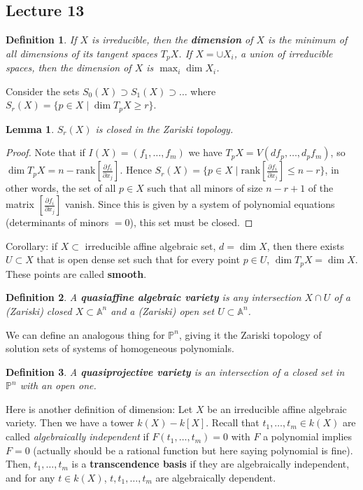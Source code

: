 \documentclass[12pt]{article}
\renewcommand{\P}{\mathbb{P}}
\newcommand{\A}{\mathbb{A}}
\newtheorem{definition}{Definition}[section]
\newtheorem{lemma}{Lemma}[section]
\begin{document}
    \subsection{Lecture 13}
    \begin{definition}
        If $X$ is irreducible, then the \textbf{dimension} of $X$ is the minimum of all dimensions of its tangent spaces $T_pX$. If $X = \cup X_i$, a union of irreducible spaces, then the dimension of $X$ is $\max_i \dim X_i$. 
    \end{definition}
    Consider the sets $S_0(X) \supset S_1(X) \supset \dots$ where $S_r(X) = \{p \in X \mid \dim T_pX \geq r\}$. 
    \begin{lemma}
        $S_r(X)$ is closed in the Zariski topology. 
    \end{lemma}
    \begin{proof}
        Note that if $I(X) = (f_1, \dots, f_m)$ we have $T_pX = V(df_p, \dots, d_pf_m)$, so $\dim T_pX = n - \mathrm{rank}\left[\frac{\partial f_i}{\partial x_j}\right]$. Hence $S_r(X) = \{p \in X \mid \mathrm{rank}\left[\frac{\partial f_i}{\partial x_j}\right] \leq n - r\}$, in other words, the set of all $p \in X$ such that all minors of size $n-r+1$ of the matrix $\left[\frac{\partial f_i}{\partial x_j}\right]$ vanish. Since this is given by a system of polynomial equations (determinants of minors $= 0$), this set must be closed. 
    \end{proof}
    Corollary: if $X \subset $ irreducible affine algebraic set, $d = \dim X$, then there exists $U \subset X$ that is open dense set such that for every point $p \in U$, $\dim T_pX = \dim X$. These points are called \textbf{smooth}.  
    \begin{definition}
        A \textbf{quasiaffine algebraic variety} is any intersection $X \cap U$ of a (Zariski) closed $X \subset \A^n$ and a (Zariski) open set $U \subset \A^n$.  
    \end{definition} 
    We can define an analogous thing for $\P^n$, giving it the Zariski topology of solution sets of systems of homogeneous polynomials. 
    \begin{definition}
        A \textbf{quasiprojective variety} is an intersection of a closed set in $\P^n$ with an open one.  
    \end{definition}
    Here is another definition of dimension: Let $X$ be an irreducible affine algebraic variety. Then we have a tower $k(X) - k[X]$. Recall that $t_1, \dots, t_m \in k(X)$ are called \textit{algebraically independent} if $F(t_1, \dots, t_m) = 0$ with $F$ a polynomial implies $F = 0$ (actually should be a rational function but here saying polynomial is fine). Then, $t_1, \dots, t_m$ is a \textbf{transcendence basis} if they are algebraically independent, and for any $t \in k(X)$, $t, t_1, \dots, t_m$ are algebraically dependent. \par 
\end{document}
